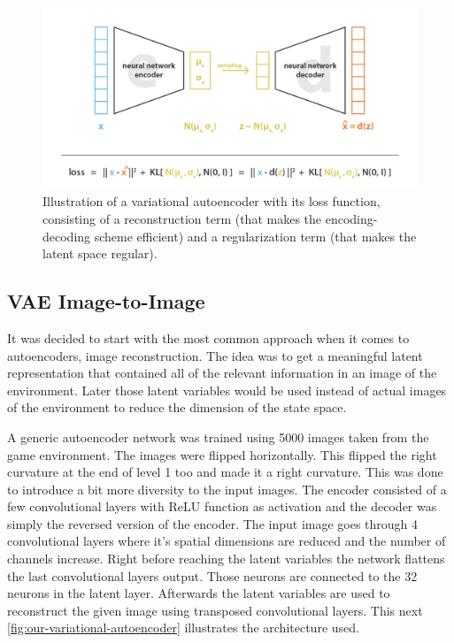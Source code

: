 \documentclass[conference]{IEEEtran}
\begin{document}
\begin{figure}[!t]
  \centering
  \includegraphics[width=1.0\linewidth]{images/variational-autoencoder.png}
  \caption{Illustration of a variational autoencoder with its loss function, consisting of a reconstruction term (that makes the encoding-decoding scheme efficient) and a regularization term (that makes the latent space regular).
}
\label{fig:variational-autoencoder}
\end{figure}

\subsection{VAE Image-to-Image}
It was decided to start with the most common approach when it comes to autoencoders, image reconstruction. The idea was to get a meaningful latent representation that contained all of the relevant information in an image of the environment. Later those latent variables would be used instead of actual images of the environment to reduce the dimension of the state space. 

A generic autoencoder network was trained using 5000 images taken from the game environment. The images were flipped horizontally. This flipped the right curvature at the end of level 1 too and made it a right curvature. This was done to introduce a bit more diversity to the input images. The encoder consisted of a few convolutional layers with ReLU function as activation and the decoder was simply the reversed version of the encoder. The input image goes through 4 convolutional layers where it's spatial dimensions are reduced and the number of channels increase. Right before reaching the latent variables the network flattens the last convolutional layers output. Those neurons are connected to the 32 neurons in the latent layer. Afterwards the latent variables are used to reconstruct the given image using transposed convolutional layers. This next \figurename  \ref{fig:our-variational-autoencoder} illustrates the architecture used. 
\end{document}
